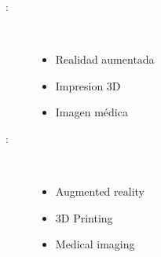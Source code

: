 \begin{multicols}{2}
\begin{description}
\item [\palabraschaveprincipal:] \mbox{} \\[-20pt]
  \begin{itemize}
    \item Realidad aumentada
    \item Impresion 3D
    \item Imagen médica
  \end{itemize}
\end{description}
\begin{description}
\item [\palabraschavesecundaria:] \mbox{} \\[-20pt]
  \begin{itemize}
    \item Augmented reality
    \item 3D Printing
    \item Medical imaging
  \end{itemize}
\end{description}
\end{multicols}
